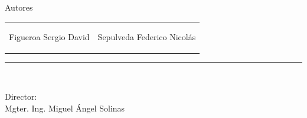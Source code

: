 \begin{titlepage}
\begin{center}
        \vspace*{0.3in}
        \begin{large} \begin{center}
          Autores  
        \end{center}
        \end{large}
        \begin{center}
            \begin{tabular}{ p{} p{} }
            		\centering 
            		\begin{large}
            		{Figueroa Sergio David}    
            		\end{large}&
            		\begin{large}
            		{Sepulveda Federico Nicolás} 
            		\end{large}
            \end{tabular}
        \end{center}
        \vspace*{0.3mm}
        \rule{100mm}{0.1mm}\\
        \vspace*{0.3mm}
        \begin{large}
            Director: \\
            Mgter. Ing. Miguel Ángel Solinas \\
        \end{large}
        

    \end{center}

\end{titlepage}
